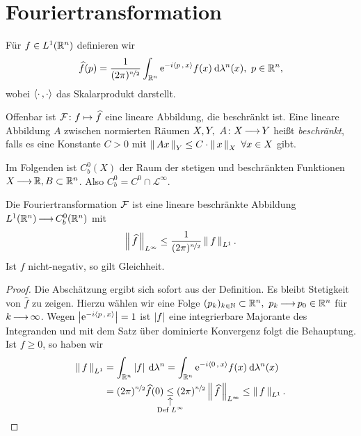 \documentclass[skript.tex]{subfiles}
\begin{document}
\chapter{Fouriertransformation}
\setcounter{cntr}{0}
\begin{defin}[Fouriertransformation]
	Für $f \in L^1(\mathbb{R}^n)$ definieren wir
	\[
		\widehat{f}(p) = \frac{1}{(2\pi)^{\nicefrac{n}{2}}} \int_{\mathbb{R}^n} \mathrm{e}^{-i \langle p\,{,}\,x \rangle} f(x) \: \mathrm{d} \lambda^n(x),\ p\in \mathbb{R}^n,
	\]
	wobei $\langle \cdot\,{,}\,\cdot \rangle$ das Skalarprodukt darstellt.
\end{defin}
Offenbar ist $\mathcal{F}\colon f \mapsto \widehat{f}$ eine lineare Abbildung, die beschränkt ist. Eine lineare Abbildung $A$ zwischen normierten Räumen $X,Y,\ A\colon X \kern -1pt \longrightarrow \kern -1pt Y$ heißt \textit{beschränkt}, falls es eine Konstante $C>0$ mit $\norm{Ax}_Y \leq C\cdot \norm{x}_X\ \forall x \in X$ gibt. 

Im Folgenden ist $C^0_b(X)$ der Raum der stetigen und beschränkten Funktionen $X\kern -1pt \longrightarrow \kern -1pt \mathbb{R}, B \subset \mathbb{R}^n$. Also $C^0_b = C^0 \cap \mathscr{L}^\infty$.

\begin{lem}
	Die Fouriertransformation $\mathcal{F}$ ist eine lineare beschränkte Abbildung $L^1({\mathbb{R}^n})  \kern -1pt \longrightarrow \kern -1pt C^0_b({\mathbb{R}^n})$ mit
	\[
		\left\lVert\, \widehat{f}\, \right\rVert_{L^\infty} \leq \frac{1}{(2\pi)^{\nicefrac{n}{2}}} \left\lVert\, f\, \right\rVert_{L^1}.
	\] 
	Ist $f$ nicht-negativ, so gilt Gleichheit. %
\end{lem}

\begin{proof}
	Die Abschätzung ergibt sich sofort aus der Definition. Es bleibt Stetigkeit von $\widehat{f}$ zu zeigen. Hierzu wählen wir eine Folge $(p_k)_{k\in\mathbb{N}} \subset {\mathbb{R}^n},\ p_k \kern -1pt \longrightarrow \kern -1pt p_0 \in {\mathbb{R}^n}$ für $k\kern -1pt \longrightarrow \kern -1pt\infty$. Wegen $\left| \mathrm{e}^{-i \langle p\,{,}\,x \rangle} \right|=1$ ist $\left| f \right|$ eine integrierbare Majorante des Integranden und mit dem Satz über dominierte Konvergenz folgt die Behauptung. Ist $f\geq0$, so haben wir 
	\begin{align*}
		\norm{f}_{L^1} &= \int_\Rn \abs{f} \md \lambda^n = \int_{\Rn} \e^{-i \skp{0}{x}} f(x) \md \lambda^n(x)\\
		&= (2\pi)^{\nicefrac{n}{2}} \widehat{f}(0) \uarrow{\text{Def }L^\infty}{\leq} (2\pi)^{\nicefrac{n}{2}} \norm{\widehat{f}}_{L^\infty} \leq \norm{f}_{L^1}.
	\end{align*}
\end{proof}
\end{document}
